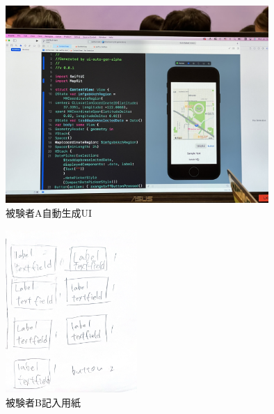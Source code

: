 \begin{figure}[htbp]
  \begin{minipage}{\hsize}
    \begin{center}
       \includegraphics[width=100mm]{img/usertest_autogen_1.jpeg}
    \end{center}
    \caption{被験者A自動生成UI}
    \label{fig:usertest_autogen_1}
  \end{minipage}
\end{figure}



\begin{figure}[htbp]
  \begin{minipage}{\hsize}
    \begin{center}
       \includegraphics[width=50mm]{img/usertest_viewstructure_2.png}
    \end{center}
    \caption{被験者B記入用紙}
    \label{fig:usertest_viewstructure_2}
  \end{minipage}
\end{figure}


